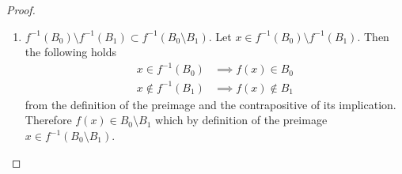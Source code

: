 \documentclass{article}
\begin{document}
\begin{proof}
\begin{enumerate}
\begin{enumerate}
          \item $f^{-1} (B_0) \setminus f^{-1} (B_1) \subset f^{-1} (B_0 \setminus B_1)$. Let $x \in f^{-1} (B_0) \setminus f^{-1} (B_1)$. Then the following holds 
            \begin{align}
              x \in f^{-1} (B_0) & \implies f(x) \in B_0 \\
              x \not\in f^{-1} (B_1) & \implies f(x) \not\in B_1
            \end{align} 
            from the definition of the preimage and the contrapositive of its implication. Therefore $f(x) \in B_0 \setminus B_1$ which by definition of the preimage $x \in f^{-1} (B_0 \setminus B_1)$. 
        \end{enumerate}
      \end{enumerate}
    \end{proof}
\end{document}
